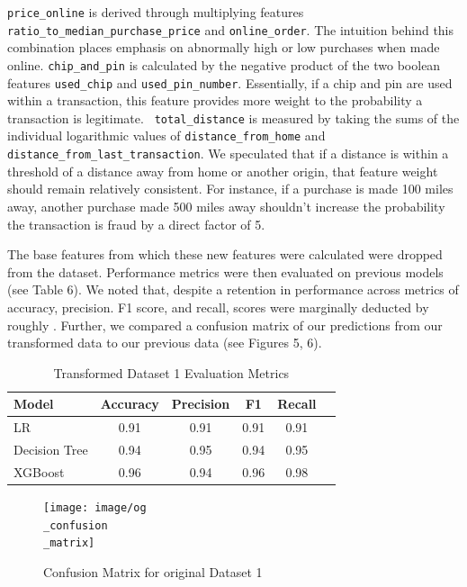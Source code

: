\documentclass{article}
\begin{document}
\texttt{price\_online} is derived through multiplying features \texttt{ratio\_to\_median\_purchase\_price} and \texttt{online\_order}. The intuition behind this combination places emphasis on abnormally high or low purchases when made online. 
\texttt{chip\_and\_pin} is calculated by the negative product of the two boolean features \texttt{used\_chip} and \texttt{used\_pin\_number}. Essentially, if a chip and pin are used within a transaction, this feature provides more weight to the probability a transaction is legitimate.
\texttt{ total\_distance} is measured by taking the sums of the individual logarithmic values of \texttt{distance\_from\_home} and \texttt{distance\_from\_last\_transaction}. We speculated that if a distance is within a threshold of a distance away from home or another origin, that feature weight should remain relatively consistent. For instance, if a purchase is made 100 miles away, another purchase made 500 miles away shouldn't increase the probability the transaction is fraud by a direct factor of 5. 

The base features from which these new features were calculated were dropped from the dataset. Performance metrics were then evaluated on previous models (see Table 6). We noted that, despite a retention in performance across metrics of accuracy, precision. F1 score, and recall, scores were marginally deducted by roughly . Further, we compared a confusion matrix of our predictions from our transformed data to our previous data (see Figures 5, 6).

\begin{table}[ht]
\centering

\label{tab:card_trans_metrics}
\begin{tabular}{lccccc}
\toprule
Model & Accuracy & Precision & F1 & Recall\\
\midrule
LR & 0.91 & 0.91 & 0.91 & 0.91\\
Decision Tree & 0.94& 0.95& 0.94& 0.95\\
XGBoost & 0.96& 0.94& 0.96& 0.98\\
\bottomrule
\end{tabular}
\caption{Transformed Dataset 1 Evaluation Metrics}
\end{table}

\begin{figure}[htbp]
\centering
\texttt{[image: image/og\\\_confusion\\\_matrix]} %
\caption{Confusion Matrix for original Dataset 1}
\label{fig:my_photo} %
\end{figure}
\end{document}
